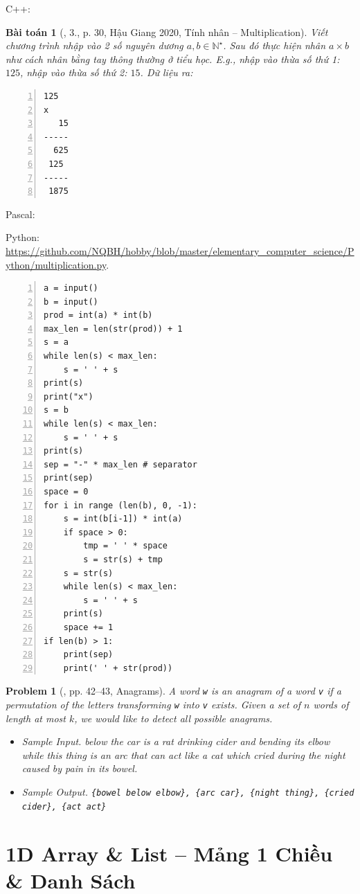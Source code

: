 \documentclass{article}
\newtheorem{baitoan}{Bài toán}
\newtheorem{problem}{Problem}
\begin{document}
C++:

\begin{baitoan}[\cite{VietSTEM2021}, 3., p. 30, Hậu Giang 2020, Tính nhân -- Multiplication]
	Viết chương trình nhập vào 2 số nguyên dương $a,b\in\mathbb{N}^\star$. Sau đó thực hiện nhân $a\times b$ như cách nhân bằng tay thông thường ở tiểu học. E.g., nhập vào thừa số thứ 1: $125$, nhập vào thừa số thứ 2: $15$. {\sf Dữ liệu ra:}
	\begin{Verbatim}[numbers=left,xleftmargin=5mm]
  125
x
   15
-----
  625
 125
-----
 1875
	\end{Verbatim}
\end{baitoan}
\noindent Pascal:

Python: \url{https://github.com/NQBH/hobby/blob/master/elementary_computer_science/Python/multiplication.py}.
\begin{Verbatim}[numbers=left,xleftmargin=5mm]
a = input()
b = input()
prod = int(a) * int(b)
max_len = len(str(prod)) + 1
s = a
while len(s) < max_len:
    s = ' ' + s
print(s)
print("x")
s = b
while len(s) < max_len:
    s = ' ' + s
print(s)
sep = "-" * max_len # separator
print(sep)
space = 0
for i in range (len(b), 0, -1):
    s = int(b[i-1]) * int(a)
    if space > 0:
        tmp = ' ' * space
        s = str(s) + tmp
    s = str(s)
    while len(s) < max_len:
        s = ' ' + s
    print(s)
    space += 1
if len(b) > 1:
    print(sep)
    print(' ' + str(prod))
\end{Verbatim}

\begin{problem}[\cite{Durr_Vie2021}, pp. 42--43, Anagrams]
	A word {\tt w} is an \emph{anagram} of a word {\tt v} if a permutation of the letters transforming {\tt w} into {\tt v} exists. Given a set of $n$ words of length at most $k$, we would like to detect all possible anagrams.
	\begin{itemize}
		\item {\sf Sample Input.} below the car is a rat drinking cider and bending its elbow while this thing is an arc that can act like a cat which cried during the night caused by pain in its bowel.
		\item {\sf Sample Output.} \verb|{bowel below elbow}, {arc car}, {night thing}, {cried cider}, {act act}|
	\end{itemize}
\end{problem}


\section{1D Array \& List -- Mảng 1 Chiều \& Danh Sách}
\end{document}
